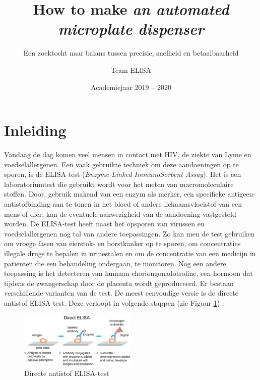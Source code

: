\documentclass[a4paper,twoside,kulak]{kulakreport} %
\title{How to make \textit{an automated microplate dispenser}}
\subtitle{Een zoektocht naar balans tussen precisie, snelheid en betaalbaarheid}
\author{Team ELISA}
\institute{Matthias Derez, Maxime Dujardin, Korneel Verkens, Seppe Vilain}
\date{Academiejaar 2019 -- 2020}
\begin{document}

\titlepage

\tableofcontents

\chapter*{Inleiding}
Vandaag de dag komen veel mensen in contact met HIV, de ziekte van Lyme en voedselallergenen. Een vaak gebruikte techniek om deze aandoeningen op te sporen, is de ELISA-test\cite{wikipedia} (\textit{Enzyme-Linked ImmunoSorbent Assay}). Het is een laboratoriumtest die gebruikt wordt voor het meten van macromoleculaire stoffen. Door, gebruik makend van een enzym als merker, een specifieke antigeen-antistofbinding aan te tonen in het bloed of andere lichaamsvloeistof van een mens of dier, kan de eventuele aanwezigheid van de aandoening vastgesteld worden. De ELISA-test heeft naast het opsporen van virussen en voedselallergenen nog tal van andere toepassingen\cite{ELISAApplications}. Zo kan men de test gebruiken om vroege fasen van eierstok- en borstkanker op te sporen, om concentraties illegale drugs te bepalen in urinestalen en om de concentratie van een medicijn in patiënten die een behandeling ondergaan, te monitoren. Nog een andere toepassing is het detecteren van humaan choriongonadotrofine, een hormoon dat tijdens de zwangerschap door de placenta wordt geproduceerd\cite{HumanChorionicGonadotropin}. \newline
Er bestaan verschillende varianten van de test. De meest eenvoudige versie is de directe antistof ELISA-test. Deze verloopt in volgende stappen (zie Figuur \ref{fig: directe ELISA}) \cite{AfbeeldingdirectELISA}:

\begin{figure}[h]
	\centering
	\includegraphics[width=0.5\textwidth]{ELISA.png}
	\caption{Directe antistof ELISA-test}
	\label{fig: directe ELISA}
	
\end{figure} 
\end{document}
